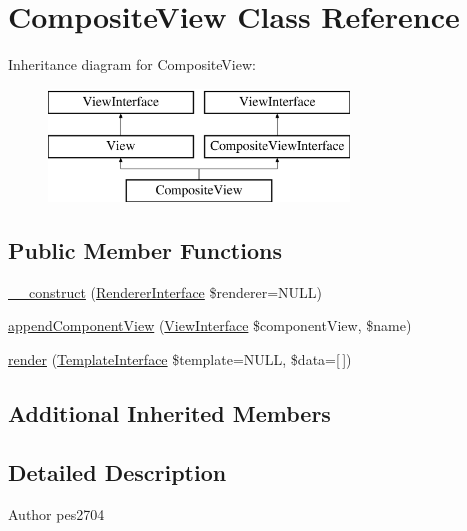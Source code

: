 \hypertarget{class_pes_1_1_view_1_1_composite_view}{}\section{Composite\+View Class Reference}
\label{class_pes_1_1_view_1_1_composite_view}
Inheritance diagram for Composite\+View\+:\begin{figure}[H]
\begin{center}
\leavevmode
\includegraphics[height=3.000000cm]{class_pes_1_1_view_1_1_composite_view}
\end{center}
\end{figure}
\subsection*{Public Member Functions}
\begin{DoxyCompactItemize}
\item 
\mbox{\hyperlink{class_pes_1_1_view_1_1_composite_view_af62e04a1fa847074a86af330864028d3}{\+\_\+\+\_\+construct}} (\mbox{\hyperlink{interface_pes_1_1_view_1_1_renderer_1_1_renderer_interface}{Renderer\+Interface}} \$renderer=N\+U\+LL)
\item 
\mbox{\hyperlink{class_pes_1_1_view_1_1_composite_view_a2ab16e76a45210ebd3f14c0df914f3b9}{append\+Component\+View}} (\mbox{\hyperlink{interface_pes_1_1_view_1_1_view_interface}{View\+Interface}} \$component\+View, \$name)
\item 
\mbox{\hyperlink{class_pes_1_1_view_1_1_composite_view_a62b5a3861ff3b1f8a28911db4c11ae47}{render}} (\mbox{\hyperlink{interface_pes_1_1_view_1_1_template_1_1_template_interface}{Template\+Interface}} \$template=N\+U\+LL, \$data=\mbox{[}$\,$\mbox{]})
\end{DoxyCompactItemize}
\subsection*{Additional Inherited Members}


\subsection{Detailed Description}
\begin{DoxyAuthor}{Author}
pes2704 
\end{DoxyAuthor}


